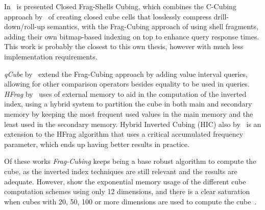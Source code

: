 In~ is presented Closed Frag-Shells Cubing, which combines the C-Cubing approach by~ of creating closed cube cells that losslessly compress drill-down/roll-up semantics, with the Frag-Cubing approach of using shell fragments, adding their own bitmap-based indexing on top to enhance query response times.
This work is probably the closest to this own thesis, however with much less implementation requirements.

\textit{qCube} by~ extend the Frag-Cubing approach by adding value interval queries, allowing for other comparison operators besides equality to be used in queries.
\textit{HFrag} by~ uses of external memory to aid in the computation of the inverted index, using a hybrid system to partition the cube in both main and secondary memory by keeping the most frequent used values in the main memory and the least used in the secondary memory.
Hybrid Inverted Cubing (HIC) also by~ is an extension to the HFrag algorithm that uses a critical accumulated frequency parameter, which ends up having better results in practice.

Of these works \textit{Frag-Cubing} keeps being a base robust algorithm to compute the cube, as the inverted index techniques are still relevant and the results are adequate.
However,  show the exponential memory usage of the different cube computation schemes using only 12 dimensions, and there is a clear saturation when cubes with 20, 50, 100 or more dimensions are used to compute the cube~\cite{silva:2015:abordagensParaCubo}.

